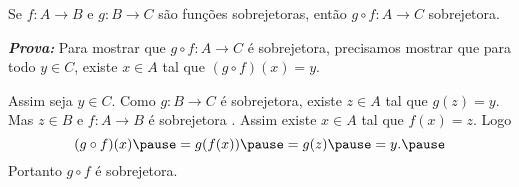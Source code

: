 \documentclass{beamer}
\begin{document}
    \begin{frame}
        \begin{proposicao}
            Se $f : A \to B$ \pause e $g : B \to C$ \pause s{\~a}o fun\c{c}\~oes sobrejetoras, \pause ent{\~a}o $g\circ f : A \to C$  sobrejetora.\pause
        \end{proposicao}
        \noindent \textbf{\textit{Prova: }}\pause
        Para mostrar que $g \circ f : A \to C$ \pause \'e sobrejetora, \pause precisamos mostrar que para todo $y \in C$, \pause existe $x \in A$ \pause tal que $(g\circ f)(x) = y$.\pause

        Assim seja $y \in C$. \pause Como $g : B \to C$ \'e sobrejetora, \pause existe $z \in A$ \pause tal que $g(z) = y$. \pause Mas $z \in B$ \pause e $f : A \to B$ \pause \'e sobrejetora \pause. Assim existe $x \in A$ \pause tal que $f(x) = z$. \pause Logo\pause
        \[
            (g\circ f)(x) \pause = g(f(x)) \pause = g(z) \pause = y.\pause
        \]
        Portanto $g \circ f$ \pause \'e sobrejetora.\pause \hspace{.5cm} \qedsymbol
    \end{frame}
\end{document}
